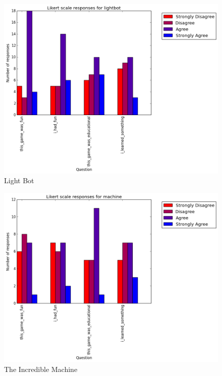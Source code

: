 			\begin{figure}[] 
			\centering 
			\includegraphics[width=\textwidth]{lightbot_likert.png} 
			\caption{Light Bot}
			\end{figure}

			\begin{figure}[] 
			\centering 
			\includegraphics[width=\textwidth]{machine_likert.png} 
			\caption{The Incredible Machine}
			\end{figure}

